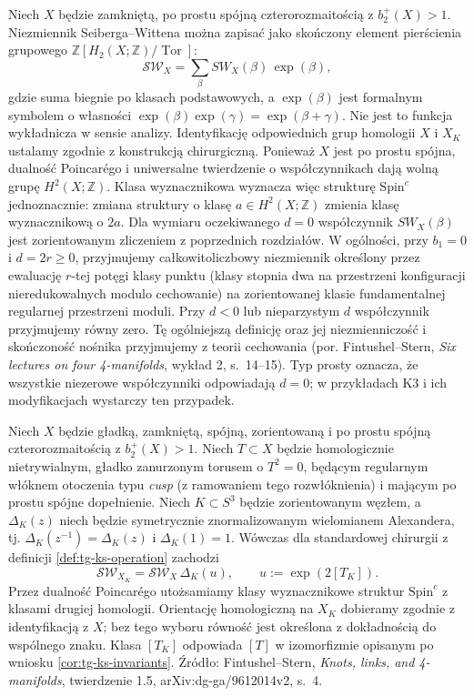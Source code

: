 Niech $X$ będzie zamkniętą, po prostu spójną czterorozmaitością
z $b_2^+(X)>1$. Niezmiennik Seiberga--Wittena można zapisać
jako skończony element pierścienia grupowego
$\mathbb Z[H_2(X;\mathbb Z)/\operatorname{Tor}]$:
\[
\mathcal{SW}_X=\sum_{\beta}SW_X(\beta)\,\exp(\beta),
\]
gdzie suma biegnie po klasach podstawowych, a
$\exp(\beta)$ jest formalnym symbolem o własności
$\exp(\beta)\exp(\gamma)=\exp(\beta+\gamma)$.
Nie jest to funkcja wykładnicza w sensie analizy.
Identyfikację odpowiednich grup homologii $X$
i $X_K$ ustalamy zgodnie z konstrukcją chirurgiczną.
Ponieważ $X$ jest po prostu spójna, dualność
Poincarégo i uniwersalne twierdzenie o współczynnikach
dają wolną grupę $H^2(X;\mathbb Z)$. Klasa wyznacznikowa
wyznacza więc strukturę $\mathrm{Spin}^c$ jednoznacznie:
zmiana struktury o klasę $a\in H^2(X;\mathbb Z)$
zmienia klasę wyznacznikową o $2a$.
Dla wymiaru oczekiwanego $d=0$ współczynnik $SW_X(\beta)$
jest zorientowanym zliczeniem z poprzednich rozdziałów.
W ogólności, przy $b_1=0$ i $d=2r\ge0$, przyjmujemy
całkowitoliczbowy niezmiennik określony przez ewaluację
$r$-tej potęgi klasy punktu (klasy stopnia dwa na
przestrzeni konfiguracji nieredukowalnych modulo
cechowanie) na zorientowanej klasie fundamentalnej
regularnej przestrzeni moduli. Przy $d<0$ lub
nieparzystym $d$ współczynnik przyjmujemy równy zero.
Tę ogólniejszą definicję oraz jej niezmienniczość
i skończoność nośnika przyjmujemy z teorii cechowania
(por. Fintushel--Stern, \emph{Six lectures on four
4-manifolds}, wykład 2, s.~14--15).
Typ prosty oznacza, że wszystkie niezerowe
współczynniki odpowiadają $d=0$; w przykładach K3
i ich modyfikacjach wystarczy ten przypadek.

\begin{twierdzenie}
\label{thm:tg-ks-formula}
Niech $X$ będzie gładką, zamkniętą, spójną,
zorientowaną i po prostu spójną czterorozmaitością
z $b_2^+(X)>1$. Niech $T\subset X$ będzie homologicznie
nietrywialnym, gładko zanurzonym torusem o $T^2=0$,
będącym regularnym włóknem otoczenia typu
\emph{cusp} (z ramowaniem tego rozwłóknienia) i mającym
po prostu spójne dopełnienie. Niech
$K\subset S^3$ będzie zorientowanym węzłem,
a $\Delta_K(z)$ niech będzie symetrycznie
znormalizowanym wielomianem Alexandera, tj.
$\Delta_K(z^{-1})=\Delta_K(z)$ i $\Delta_K(1)=1$.
Wówczas dla standardowej chirurgii z definicji
\ref{def:tg-ks-operation} zachodzi
\[
\mathcal{SW}_{X_K}=\mathcal{SW}_X\,\Delta_K(u),
\qquad u:=\exp(2[T_K]).
\]
Przez dualność Poincarégo utożsamiamy klasy
wyznacznikowe struktur $\mathrm{Spin}^c$ z klasami
drugiej homologii. Orientację homologiczną
na $X_K$ dobieramy zgodnie z identyfikacją
z $X$; bez tego wyboru równość jest określona
z dokładnością do wspólnego znaku.
Klasa $[T_K]$ odpowiada $[T]$ w izomorfizmie
opisanym po wniosku \ref{cor:tg-ks-invariants}.
Źródło: Fintushel--Stern, \emph{Knots, links, and 4-manifolds},
twierdzenie 1.5, arXiv:dg-ga/9612014v2, s.~4.
\end{twierdzenie}

